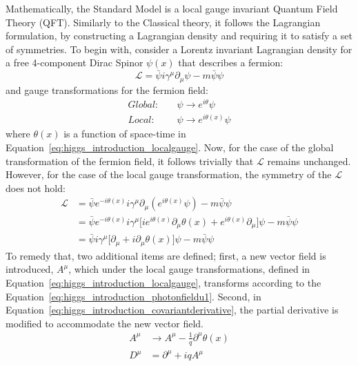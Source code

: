 Mathematically, the Standard Model is a local gauge invariant Quantum Field Theory (QFT). Similarly to the Classical theory, it follows the Lagrangian formulation, by constructing a Lagrangian density and requiring it to satisfy a set of symmetries. To begin with, consider a Lorentz invariant Lagrangian density for a free 4-component Dirac Spinor $\psi(x)$ that describes a fermion:
\begin{equation}
    \label{eq:higgs_introduction_diracLagrangian}
    \mathcal{L} = \bar{\psi}i\gamma^{\mu}\partial_{\mu}\psi - m\bar{\psi}\psi
\end{equation}
and gauge transformations for the fermion field:
\begin{subequations}\label{grp}
\begin{align}
    Global:&\quad \psi \rightarrow e^{i\theta}\psi\\
    Local:&\quad \psi \rightarrow e^{i\theta(x)}\psi\label{eq:higgs_introduction_localgauge}
\end{align}
\end{subequations}
where $\theta(x)$ is a function of space-time in Equation~\ref{eq:higgs_introduction_localgauge}. Now, for the case of the global transformation of the fermion field, it follows trivially that $\mathcal{L}$ remains unchanged. However, for the case of the local gauge transformation, the symmetry of the $\mathcal{L}$ does not hold:
\begin{equation}\label{eq:higgs_introduction_diraclocalgauge}
    \begin{split}
    \mathcal{L}& = \bar{\psi}e^{-i\theta(x)}i\gamma^{\mu}\partial_{\mu}(e^{i\theta(x)}\psi) - m\bar{\psi}\psi\\
    & = \bar{\psi}e^{-i\theta(x)}i\gamma^{\mu} \lbrack ie^{i\theta(x)}\partial_{\mu}\theta(x) + e^{i\theta(x)}\partial_{\mu} \rbrack \psi - m\bar{\psi}\psi\\
    & = \bar{\psi}i\gamma^{\mu} \lbrack \partial_{\mu} + i\partial_{\mu}\theta(x) \rbrack \psi - m\bar{\psi}\psi
    \end{split}
\end{equation}
To remedy that, two additional items are defined; first, a new vector field is introduced, $A^{\mu}$, which under the local gauge transformations, defined in Equation~\ref{eq:higgs_introduction_localgauge}, transforms according to the Equation~\ref{eq:higgs_introduction_photonfieldu1}. Second, in Equation~\ref{eq:higgs_introduction_covariantderivative}, the partial derivative is modified to accommodate the new vector field.
\begin{subequations}\label{eq:higgs_introduction_qedgauge}
\begin{align}
    A^{\mu}& \rightarrow A^{\mu} - \frac{1}{q}\partial^{\mu}\theta(x)\label{eq:higgs_introduction_photonfieldu1}\\
    D^{\mu}& = \partial^{\mu} + iqA^{\mu}\label{eq:higgs_introduction_covariantderivative}
\end{align}
\end{subequations}
